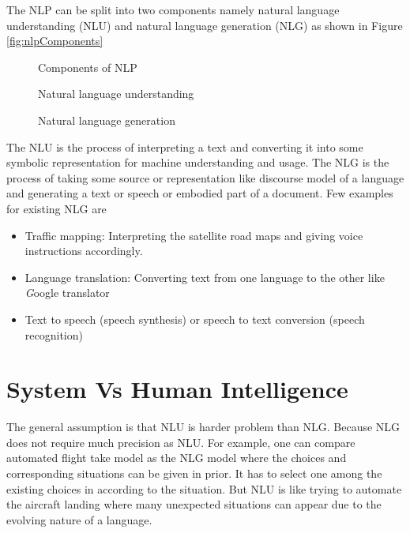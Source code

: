 \documentclass{bmcart}
\begin{document}
The NLP can be split into two components namely natural language understanding (NLU) and natural language generation (NLG) as shown in Figure \ref{fig:nlpComponents}

\begin{figure}
	\begin{minipage}{0.5\textwidth}
		\centering
		\caption{Components of NLP}
		\label{fig:nlpComponents}
	\end{minipage}
	\begin{minipage}{0.5\textwidth}
		\centering
		\vspace{0.5cm}
		\caption{Natural language understanding}
		\label{fig:nlu}
	\end{minipage}%
		\begin{minipage}{0.5\textwidth}
		\centering
		\vspace{0.5cm}
		\caption{Natural language generation}
		\label{fig:nlg}
	\end{minipage}
\end{figure}

The NLU is the process of interpreting a text and converting it into some symbolic representation for machine understanding and usage. The NLG is the process of taking some source or representation like discourse model of a language and generating a text or speech or embodied part of a document. Few examples for existing NLG are 
\begin{itemize}
\item Traffic mapping: Interpreting the satellite road maps and giving voice instructions accordingly.
\item Language translation: Converting text from one language to the other like {\textit Google translator}
\item Text to speech (speech synthesis) or speech to text conversion (speech recognition)
\end{itemize}

\section{System Vs Human Intelligence}
\label{sec:sysVshuman}

The general assumption is that NLU is harder problem than NLG. Because NLG does not require much precision as NLU. For example, one can compare automated flight take model as the NLG model where the choices and corresponding situations can be given in prior. It has to select one among the existing choices in according to the situation.
But NLU is like trying to automate the aircraft landing where many unexpected situations can appear due to the evolving nature of a language.
\end{document}
